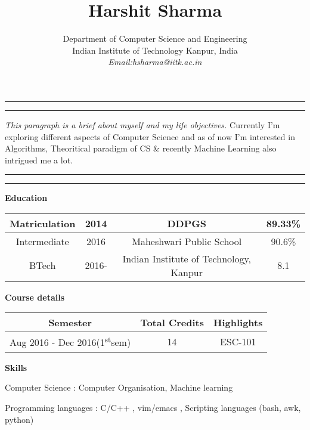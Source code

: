 \documentclass[a4paper, 11pt]{article}
\title{Harshit Sharma}
\author{%
Department of Computer Science and Engineering\\
Indian Institute of Technology Kanpur, India\\
{\it Email:hsharma@iitk.ac.in}
}
\makeatletter
\renewcommand{\maketitle}{\bgroup\setlength{\parindent}{0pt}
\begin{flushleft}
  \textbf{\@title}

  \@author
\end{flushleft}\egroup
}
\makeatother
\begin{document}
\maketitle

\noindent\hrule
\vspace{1.1mm}
\noindent\hrule

\noindent\textit{This paragraph is a brief about myself and my life objectives.}
Currently I'm exploring different aspects of Computer Science and as of now I'm interested in Algorithms, Theoritical paradigm of CS \& recently Machine Learning also intrigued me a lot. 
\noindent\hrule
\vspace{1.1mm}
\noindent\hrule
\vspace{8mm}

\noindent\textbf{Education}
\begin{flushleft}
\begin{tabular}{ |c|c|c|c| }
\hline
 Matriculation & 2014 & DDPGS & 89.33\%\\
 \hline
 Intermediate & 2016 & Maheshwari Public School & 90.6\% \\
 \hline
 BTech & 2016- & Indian Institute of Technology, Kanpur & 8.1  \\ 
 \hline
\end{tabular}
\end{flushleft}

\vspace{5mm}
\noindent\textbf{Course details}
\begin{flushleft}
\begin{tabular}{ |c|c|c| }
\hline
 \textbf{Semester} & \textbf{Total Credits} & \textbf{Highlights}\\
 \hline
 Aug 2016 - Dec 2016(1\textsuperscript{st}sem) & 14 & ESC-101\\
 \hline
\end{tabular}
\end{flushleft}
\vspace{5mm}

\noindent\textbf{Skills}

\vspace{2mm}

\noindent Computer Science : \hspace{10mm} Computer Organisation, Machine learning

\noindent Programming languages :\hspace{2mm} C/C++ , vim/emacs , Scripting languages (bash, awk, python)

\vspace{2mm}
\end{document}
